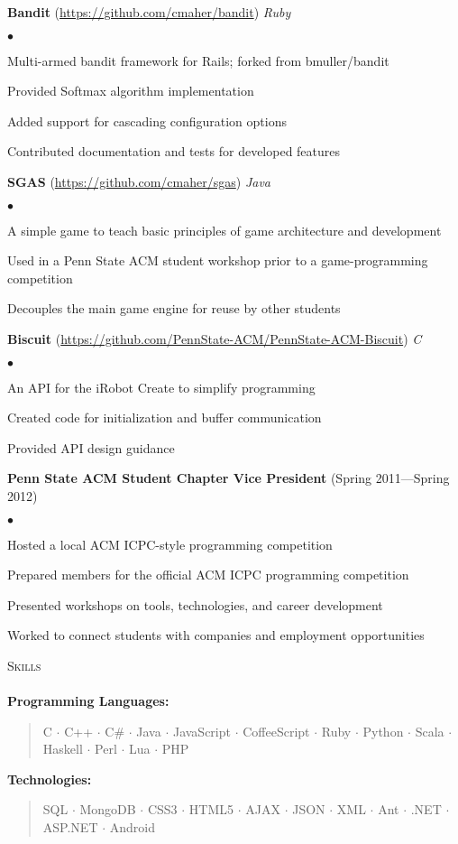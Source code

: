 \documentclass{article}
\newcommand{\skill}[2]{\textbf{#1:}  \begin{verse}#2\end{verse} }
\newcommand{\lineunder}{\vspace*{-8pt} \\ \hspace*{-18pt} \hrulefill \\}
\newcommand{\header}[1]{{\hspace*{-15pt}\vspace*{6pt} \textsc{#1}} \vspace*{-6pt} \lineunder}
\newcommand{\project}[3]{{ \textbf{#1} (\url{#2}) \hfill \textit{#3} \\ }}
\newcommand{\activity}[2]{{ \textbf{#1} (#2) \hfill \\ }}
\newenvironment{achievements}{\begin{list}{$\bullet$}{\topsep 0pt \itemsep -2pt}}{\vspace*{4pt}\end{list}}
\begin{document}
\project{Bandit}{https://github.com/cmaher/bandit}{Ruby}
    \begin{achievements}
    \item Multi-armed bandit framework for Rails; forked from bmuller/bandit
    \item Provided Softmax algorithm implementation
    \item Added support for cascading configuration options
    \item Contributed documentation and tests for developed features
    \end{achievements}

    
\project{SGAS}{https://github.com/cmaher/sgas}{Java}
    \begin{achievements}
    \item A simple game to teach basic principles of game architecture and development
    \item Used in a Penn State ACM student workshop prior to a game-programming competition
    \item Decouples the main game engine for reuse by other students
    \end{achievements}


\project{Biscuit}{https://github.com/PennState-ACM/PennState-ACM-Biscuit}{C}
    \begin{achievements}
    \item An API for the iRobot Create to simplify programming
    \item Created code for initialization and buffer communication
    \item Provided API design guidance
    \end{achievements}


\activity{Penn State ACM Student Chapter Vice President}{Spring 2011---Spring 2012}
    \begin{achievements}
    \item Hosted a local ACM ICPC-style programming competition
    \item Prepared members for the official ACM ICPC programming competition
    \item Presented workshops on tools, technologies, and career development
    \item Worked to connect students with companies and employment opportunities
    \end{achievements}


\header{Skills}
    \skill{Programming Languages}{C $\cdot$ C++ $\cdot$ C\# $\cdot$ Java $\cdot$ JavaScript $\cdot$ CoffeeScript  
        $\cdot$ Ruby $\cdot$ Python $\cdot$ Scala $\cdot$ Haskell $\cdot$ Perl $\cdot$ Lua $\cdot$ PHP}
    \skill{Technologies}{SQL $\cdot$ MongoDB $\cdot$ CSS3 $\cdot$ HTML5 $\cdot$ AJAX $\cdot$ JSON
        $\cdot$ XML $\cdot$ Ant $\cdot$ .NET $\cdot$ ASP.NET $\cdot$ Android}
\end{document}
